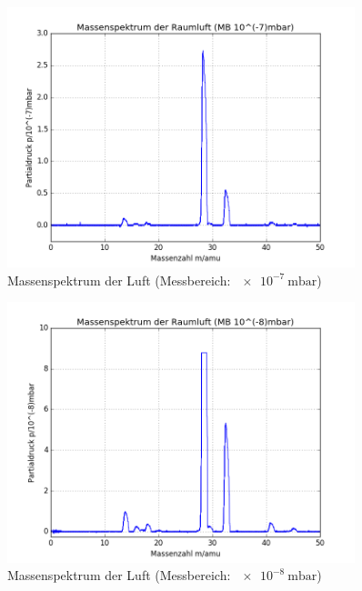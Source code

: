 \begin{figure}[tb]
	\centering\includegraphics[width=0.9\textwidth]{fig/a4_1.png}
	\caption{Massenspektrum der Luft (Messbereich: $\SI{e-7}{\milli\bar}$)}
	\label{fig:v41}
\end{figure}

\begin{figure}[tb]
	\centering\includegraphics[width=0.9\textwidth]{fig/a4_2.png}
	\caption{Massenspektrum der Luft (Messbereich: $\SI{e-8}{\milli\bar}$)}
	\label{fig:v42}
\end{figure}

